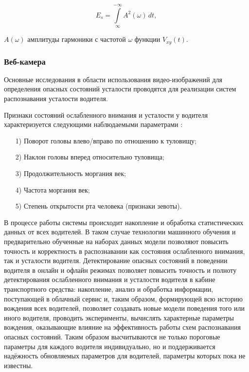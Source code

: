 \begin{equation}
\label{eq:normir}
E_s = \int\limits_{\infty}^{-\infty} A^2(\omega)\,dt,
\end{equation}

\begin{eqexpl}[15mm]
\item{$A(\omega)$} амплитуды гармоники с частотой $\omega$ функции $V_{xy}(t)$.
\end{eqexpl}

\subsubsection{Веб-камера}
Основные исследования в области использования видео-изображений для определения опасных состояний усталости проводятся для реализации систем распознавания усталости водителя.

Признаки состояний ослабленного внимания и усталости у водителя характеризуется следующими наблюдаемыми параметрами \cite{videoMethod}:
\begin{itemize}[leftmargin=1.6\parindent]
\item[1)] Поворот головы влево/вправо по отношению к туловищу;
\item[2)] Наклон головы вперед относительно туловища;
\item[3)] Продолжительность моргания век;
\item[4)] Частота моргания век;
\item[5)] Степень открытости рта человека (признаки зевоты).
\end{itemize}

В процессе работы системы происходит накопление и обработка статистических данных от всех водителей. В таком случае технологии машинного обучения и предварительно обученные на наборах данных модели позволяют повысить точность и корректность в распознавании как состояния ослабленного внимания, так и усталости водителя. Детектирование опасных состояний в поведении водителя в онлайн и офлайн режимах позволяет повысить точность и полноту детектирования ослабленного внимания и усталости водителя в кабине транспортного средства: накопление, анализ и обработка информации, поступающей в облачный сервис и, таким образом, формирующей всю историю вождения всех водителей, позволяет создавать новые модели поведения того или иного водителя, проводить эксперименты, вычислять характерные параметры вождения, оказывающие влияние на эффективность работы схем распознавания опасных состояний. Таким образом высчитываются не только пороговые параметры для каждого водителя индивидуально, но и поддерживается надёжность обновляемых параметров для водителей, параметры которых пока не известны. \cite{videoMethod}

